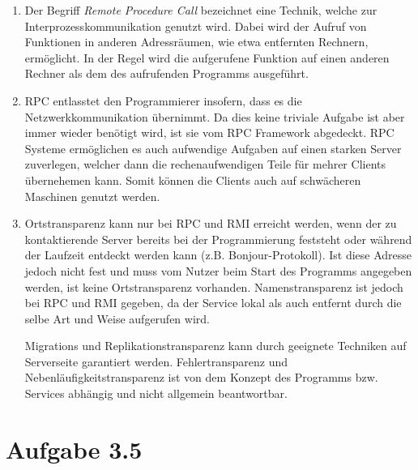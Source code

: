 \documentclass[german,12pt,a4paper]{article}
\begin{document}
\begin{enumerate}

	\item Der Begriff \textit{Remote Procedure Call} bezeichnet eine Technik, welche zur Interprozesskommunikation genutzt wird. 
	Dabei wird der Aufruf von Funktionen in anderen Adressräumen, wie etwa entfernten Rechnern, ermöglicht. In der Regel wird die 
	aufgerufene Funktion auf einen anderen Rechner als dem des aufrufenden Programms ausgeführt.
	 
	\item RPC entlasstet den Programmierer insofern, dass es die Netzwerkkommunikation übernimmt. Da
		dies keine triviale Aufgabe ist aber immer wieder benötigt wird, ist sie vom RPC Framework
		abgedeckt. RPC Systeme ermöglichen es auch aufwendige Aufgaben auf einen starken Server
		zuverlegen, welcher dann die rechenaufwendigen Teile für mehrer Clients übernehemen kann. Somit
		können die Clients auch auf schwächeren Maschinen genutzt werden.

	\item Ortstransparenz kann nur bei RPC und RMI erreicht werden, wenn der zu kontaktierende Server
		bereits bei der Programmierung feststeht oder während der Laufzeit entdeckt werden kann (z.B.
		Bonjour-Protokoll). Ist diese Adresse jedoch nicht fest und muss vom Nutzer beim Start des
		Programms angegeben werden, ist keine Ortstransparenz vorhanden.  Namenstransparenz ist jedoch
		bei RPC und RMI gegeben, da der Service lokal als auch entfernt durch die selbe Art und Weise
		aufgerufen wird.

		Migrations und Replikationstransparenz kann durch geeignete Techniken auf Serverseite garantiert
		werden. Fehlertransparenz und Nebenläufigkeitstransparenz ist von dem Konzept des Programms bzw.
		Services abhängig und nicht allgemein beantwortbar.
	
\end{enumerate}

\section*{Aufgabe 3.5}
\end{document}
